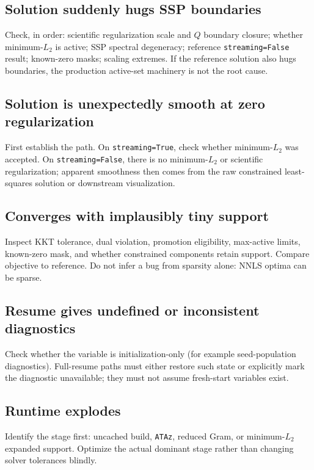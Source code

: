 \documentclass[10pt,a4paper]{article}
\newcommand{\code}[1]{\texttt{#1}}
\begin{document}
\subsection{Solution suddenly hugs SSP boundaries}
Check, in order: scientific regularization scale and $Q$ boundary closure; whether minimum-$L_2$ is active; SSP spectral degeneracy; reference \code{streaming=False} result; known-zero masks; scaling extremes. If the reference solution also hugs boundaries, the production active-set machinery is not the root cause.

\subsection{Solution is unexpectedly smooth at zero regularization}
First establish the path. On \code{streaming=True}, check whether minimum-$L_2$ was accepted. On \code{streaming=False}, there is no minimum-$L_2$ or scientific regularization; apparent smoothness then comes from the raw constrained least-squares solution or downstream visualization.

\subsection{Converges with implausibly tiny support}
Inspect KKT tolerance, dual violation, promotion eligibility, max-active limits, known-zero mask, and whether constrained components retain support. Compare objective to reference. Do not infer a bug from sparsity alone: NNLS optima can be sparse.

\subsection{Resume gives undefined or inconsistent diagnostics}
Check whether the variable is initialization-only (for example seed-population diagnostics). Full-resume paths must either restore such state or explicitly mark the diagnostic unavailable; they must not assume fresh-start variables exist.

\subsection{Runtime explodes}
Identify the stage first: uncached build, \code{ATAz}, reduced Gram, or minimum-$L_2$ expanded support. Optimize the actual dominant stage rather than changing solver tolerances blindly.
\end{document}
